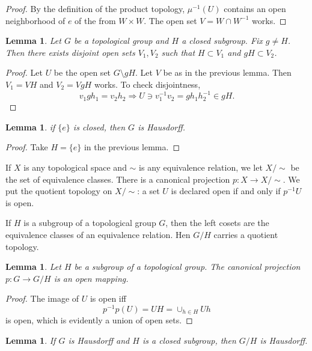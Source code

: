 \documentclass{amsart}
\newtheorem{lemma}[equation]{Lemma}
\begin{document}
\begin{proof} By the definition of the product topology, $\mu^{-1}(U)$ contains an open
neighborhood of $e$ of the from $W\times W$.  The open set $V = W\cap W^{-1}$ works.
\end{proof}

\begin{lemma} Let $G$ be a topological group and $H$ a closed subgroup.  Fix $g\ne H$.
Then there exists disjoint open sets $V_1,V_2$ such that $H\subset V_1$ and $gH\subset V_2$.
\end{lemma}

\begin{proof}  Let $U$ be the open set $G\setminus g H$.  Let $V$ be as in the
previous lemma.  Then $V_1 = VH$ and $V_2 = VgH$ works.  To check disjointness,
\[
v_1 g h_1 = v_2 h_2 \Longrightarrow U \owns v_1^{-1}v_2 = g h_1 h_2^{-1} \in g H.
\]
\end{proof}

\begin{lemma} if $\{e\}$ is closed, then $G$ is Hausdorff.
\end{lemma}

\begin{proof} Take $H = \{e\}$ in the previous lemma.
\end{proof}

If $X$ is any topological space and $\sim$ is any equivalence relation,
we let $X/\sim$ be the set of equivalence classes.  There is a canonical
projection $p:X\to X/\sim$.  We put the quotient topology on $X/\sim$:
a set $U$ is declared open if and only if $p^{-1}U$ is open.

If $H$ is a subgroup of a topological group $G$, then the left cosets are the equivalence
classes of an equivalence relation.  Hen $G/H$ carries a quotient topology.

\begin{lemma} Let $H$ be a subgroup of a topological group.  The canonical
projection $p:G\to G/H$ is an open mapping.
\end{lemma}

\begin{proof} The image of $U$ is open iff 
\[
p^{-1}p (U) = UH =\cup_{h\in H} Uh
\]
is open, which is evidently a union of open sets.
\end{proof}

\begin{lemma} If $G$ is Hausdorff and $H$ is a closed subgroup, then $G/H$ is
Hausdorff.
\end{lemma}
\end{document}
